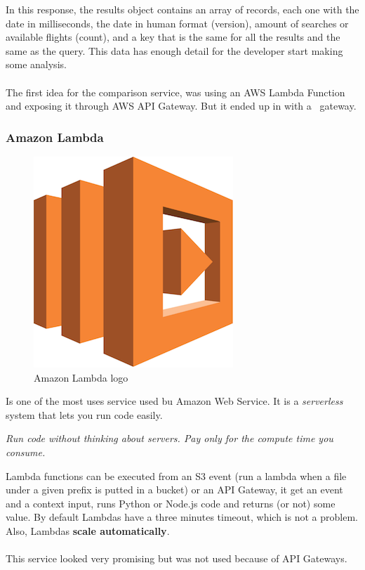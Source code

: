 In this response, the results object contains an array of records, each one with the date in milliseconds, the date in human format (version), amount of searches or available flights (count), and a key that is the same for all the results and the same as the query. This data has enough detail for the developer start making some analysis.
\\\\
The first idea for the comparison service, was using an AWS Lambda Function and exposing it through AWS API Gateway. But it ended up in  with a \company\ gateway.

\subsubsection*{Amazon Lambda} \label{lambda}

\begin{figure}[H]
\centering
\includegraphics[scale=0.1]{resources/lambda-logo.png}
\caption{Amazon Lambda logo}
\end{figure}

Is one of the most uses service used bu Amazon Web Service. It is a \textit{serverless} system that lets you run code easily.

\begin{displayquote}
\textit{Run code without thinking about servers. Pay only for the compute time you consume.}
\end{displayquote}

Lambda\cite{lambda} functions can be executed from an S3 event (run a lambda when a file under a given prefix is putted in a bucket) or an API Gateway, it get an event and a context input, runs Python\cite{python} or Node.js\cite{nodejs} code and returns (or not) some value. By default Lambdas have a three minutes timeout, which is not a problem. Also, Lambdas \textbf{scale automatically}.
\\\\
This service looked very promising but was not used because of API Gateways.

